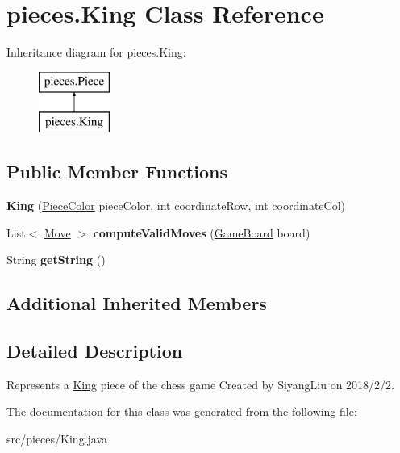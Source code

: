 \hypertarget{classpieces_1_1_king}{}\section{pieces.\+King Class Reference}
\label{classpieces_1_1_king}
Inheritance diagram for pieces.\+King\+:\begin{figure}[H]
\begin{center}
\leavevmode
\includegraphics[height=2.000000cm]{classpieces_1_1_king}
\end{center}
\end{figure}
\subsection*{Public Member Functions}
\begin{DoxyCompactItemize}
\item 
\mbox{\label{classpieces_1_1_king_a61930731a6bbc9575382f8b64b59b338}} 
{\bfseries King} (\mbox{\hyperlink{enumpieces_1_1_piece_1_1_piece_color}{Piece\+Color}} piece\+Color, int coordinate\+Row, int coordinate\+Col)
\item 
\mbox{\label{classpieces_1_1_king_a8aa9bef31ee7ffa9f7aabdd8a0f31900}} 
List$<$ \mbox{\hyperlink{classpieces_1_1_move}{Move}} $>$ {\bfseries compute\+Valid\+Moves} (\mbox{\hyperlink{classgameboard_1_1_game_board}{Game\+Board}} board)
\item 
\mbox{\label{classpieces_1_1_king_a99f41490f4eeb1380b078c01d100e568}} 
String {\bfseries get\+String} ()
\end{DoxyCompactItemize}
\subsection*{Additional Inherited Members}


\subsection{Detailed Description}
Represents a \mbox{\hyperlink{classpieces_1_1_king}{King}} piece of the chess game Created by Siyang\+Liu on 2018/2/2. 

The documentation for this class was generated from the following file\+:\begin{DoxyCompactItemize}
\item 
src/pieces/King.\+java\end{DoxyCompactItemize}
